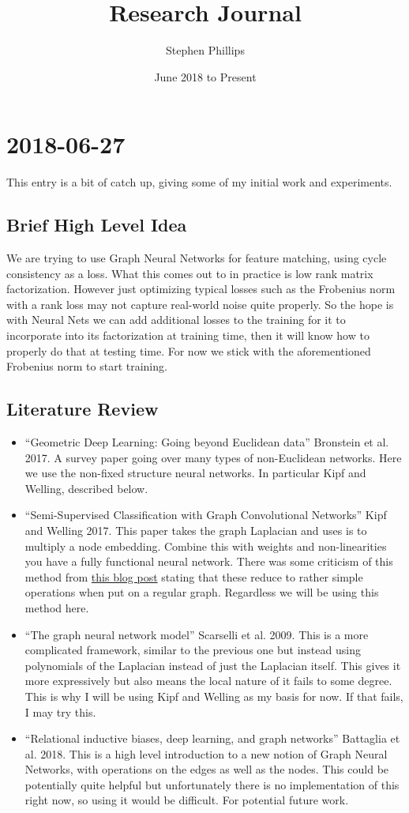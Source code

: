 \documentclass[a4paper]{article}
\title{Research Journal}
\author{Stephen Phillips}
\date{June 2018 to Present}
\newcommand{\DatestampYMD}[3]{\mbox{#1-#2-#3}}
\newcommand{\entry}[3]{\newpage\section*{\DatestampYMD{#1}{#2}{#3}} }
\begin{document}
\maketitle

\entry{2018}{06}{27}
This entry is a bit of catch up, giving some of my initial work and experiments.
\subsection*{Brief High Level Idea}
We are trying to use Graph Neural Networks for feature matching, using cycle consistency as a loss. What this comes out to in practice is low rank matrix factorization. However just optimizing typical losses such as the Frobenius norm with a rank loss may not capture real-world noise quite properly. So the hope is with Neural Nets we can add additional losses to the training for it to incorporate into its factorization at training time, then it will know how to properly do that at testing time. For now we stick with the aforementioned Frobenius norm to start training.

\subsection*{Literature Review}
\begin{itemize}
\item ``Geometric Deep Learning: Going beyond Euclidean data'' Bronstein et al. 2017. A survey paper going over many types of non-Euclidean networks. Here we use the non-fixed structure neural networks. In particular Kipf and Welling, described below.
\item ``Semi-Supervised Classification with Graph Convolutional Networks'' Kipf and Welling 2017. This paper takes the graph Laplacian and uses is to multiply a node embedding. Combine this with weights and non-linearities you have a fully functional neural network. There was some criticism of this method from \href{https://www.inference.vc/how-powerful-are-graph-convolutions-review-of-kipf-welling-2016-2/}{this blog post} stating that these reduce to rather simple operations when put on a regular graph. Regardless we will be using this method here.
\item ``The graph neural network model'' Scarselli et al. 2009. This is a more complicated framework, similar to the previous one but instead using polynomials of the Laplacian instead of just the Laplacian itself. This gives it more expressively but also means the local nature of it fails to some degree. This is why I will be using Kipf and Welling as my basis for now. If that fails, I may try this.
\item ``Relational inductive biases, deep learning, and graph networks'' Battaglia et al. 2018. This is a high level introduction to a new notion of Graph Neural Networks, with operations on the edges as well as the nodes. This could be potentially quite helpful but unfortunately there is no implementation of this right now, so using it would be difficult. For potential future work.
\end{itemize}
\end{document}
